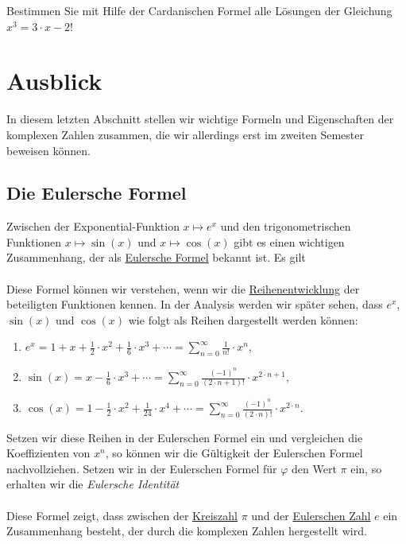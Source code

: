 \exercise
Bestimmen Sie mit Hilfe der Cardanischen Formel alle L\"{o}sungen der Gleichung 
\\[0.2cm]
\hspace*{1.3cm}
$x^3 = 3 \cdot x - 2$!
\exend


\section{Ausblick}
In diesem letzten Abschnitt stellen wir wichtige Formeln und Eigenschaften der komplexen Zahlen
zusammen, die wir allerdings erst im zweiten Semester beweisen k\"{o}nnen.

\subsection{Die Eulersche Formel}
Zwischen der Exponential-Funktion $x \mapsto e^x$ und den trigonometrischen Funktionen 
$x \mapsto \sin(x)$ und $x \mapsto \cos(x)$ gibt es einen wichtigen Zusammenhang, der als
{\href{https://de.wikipedia.org/wiki/Eulersche_Formel}{Eulersche Formel}} bekannt ist.  Es gilt
\\[0.2cm]
\hspace*{1.3cm}
\colorbox{red}{}
\\[0.2cm]
Diese Formel k\"{o}nnen wir verstehen, wenn wir die
\href{https://de.wikipedia.org/wiki/Taylorreihe}{Reihenentwicklung} der beteiligten Funktionen
kennen.  In der Analysis werden wir sp\"{a}ter sehen, dass $e^x$, $\sin(x)$ und $\cos(x)$ wie folgt als Reihen
dargestellt werden k\"{o}nnen:
\begin{enumerate}
\item $\displaystyle e^x = 1 + x + \frac{1}{2} \cdot x^2 + \frac{1}{6} \cdot x^3 + \cdots = \sum\limits_{n=0}^\infty \frac{1}{n!} \cdot x^n$,
\item $\displaystyle \sin(x) = x - \frac{1}{6} \cdot x^3 + \cdots = \sum\limits_{n=0}^\infty \frac{(-1)^{n}}{(2 \cdot n + 1)!} \cdot x^{2 \cdot n + 1}$,
\item $\displaystyle \cos(x) = 1 -  \frac{1}{2} \cdot x^2 +  \frac{1}{24} \cdot x^4 + \cdots = \sum\limits_{n=0}^\infty  \frac{(-1)^{n}}{(2 \cdot n)!} \cdot x^{2 \cdot n}$.
\end{enumerate}
Setzen wir diese Reihen in der Eulerschen Formel ein und vergleichen die Koeffizienten von $x^n$, so
k\"{o}nnen wir die G\"{u}ltigkeit der Eulerschen Formel nachvollziehen.  Setzen wir in der Eulerschen Formel
f\"{u}r $\varphi$ den Wert $\pi$ ein, so erhalten wir die {\emph{\color{blue}Eulersche Identit\"{a}t}}
\\[0.2cm]
\hspace*{1.3cm}
\colorbox{red}{}
\\[0.2cm]
Diese Formel zeigt, dass zwischen der \href{https://de.wikipedia.org/wiki/Kreiszahl}{Kreiszahl} $\pi$ und der 
\href{https://de.wikipedia.org/wiki/Eulersche_Zahl}{Eulerschen Zahl} $e$ ein Zusammenhang besteht,
der durch die komplexen Zahlen hergestellt wird.


